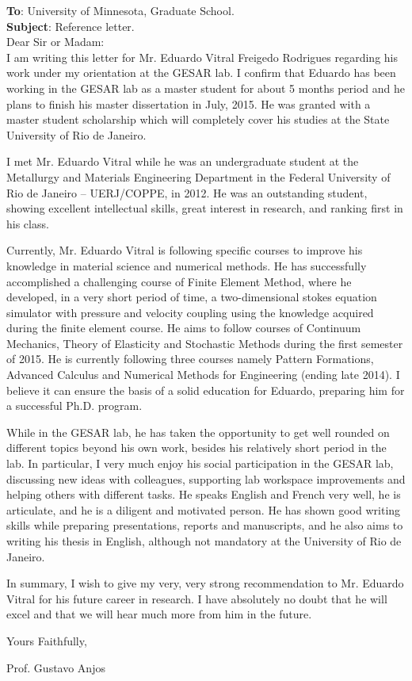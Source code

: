 \documentclass[12pt,a4paper]{article}
\begin{document}
\vspace*{1.5cm}
\noindent \textbf{To}: University of Minnesota, Graduate School.\\
\noindent \textbf{Subject}: Reference letter.\\

\noindent Dear Sir or Madam:\\

I am writing this letter for Mr. Eduardo Vitral Freigedo Rodrigues
regarding his work under my orientation at the GESAR lab. I confirm
that Eduardo has been working in the GESAR lab as a master student for
about 5 months period and he plans to finish his master dissertation in
July, 2015. He was granted with a master student scholarship which will
completely cover his studies at the State University of Rio de
Janeiro.

I met Mr. Eduardo Vitral while he was an undergraduate student at the
Metallurgy and Materials Engineering Department in the Federal University
of Rio de Janeiro -- UERJ/COPPE, in 2012. He was an outstanding student,
showing excellent intellectual skills, great interest in research, and
ranking first in his class.

Currently, Mr. Eduardo Vitral is following specific courses to improve
his knowledge in material science and numerical methods. He has
successfully accomplished a challenging course of Finite Element Method,
where he developed, in a very short period of time, a two-dimensional
stokes equation simulator with pressure and velocity coupling using the
knowledge acquired during the finite element course. He aims to follow
courses of Continuum Mechanics, Theory of Elasticity and Stochastic
Methods during the first semester of 2015. He is currently following
three courses namely Pattern Formations, Advanced Calculus and Numerical
Methods for Engineering (ending late 2014). I believe it can ensure
the basis of a solid education for Eduardo, preparing him for a
successful Ph.D. program. 

While in the GESAR lab, he has taken the opportunity to get well rounded
on different topics beyond his own work, besides his relatively short
period in the lab. In particular, I very much enjoy his social
participation in the GESAR lab, discussing new ideas with colleagues,
supporting lab workspace improvements and helping others with different
tasks. He speaks English and French very well, he is articulate, and he
is a diligent and motivated person. He has shown good writing skills
while preparing presentations, reports and manuscripts, and he also
aims to writing his thesis in English, although not mandatory at the
University of Rio de Janeiro.

In summary, I wish to give my very, very strong recommendation to Mr.
Eduardo Vitral for his future career in research. I have absolutely no
doubt that he will excel and that we will hear much more from him in the
future.

Yours Faithfully,

\vspace{2cm}

\begin{center}
Prof. Gustavo Anjos
\end{center}
\end{document}
